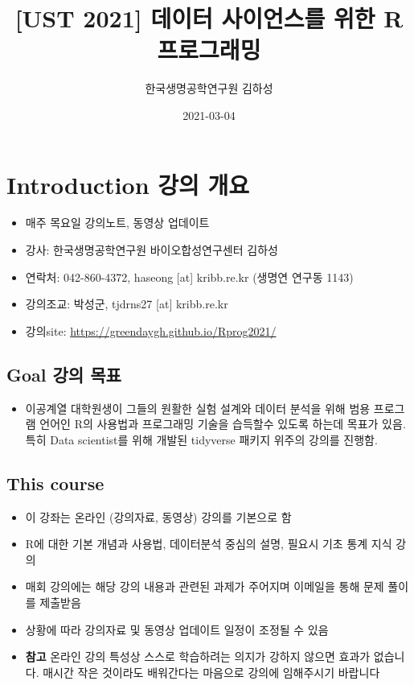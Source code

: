 \documentclass[
]{book}
\title{{[}UST 2021{]} 데이터 사이언스를 위한 R 프로그래밍}
\author{한국생명공학연구원 김하성}
\date{2021-03-04}
\providecommand{\tightlist}{%
  \setlength{\itemsep}{0pt}\setlength{\parskip}{0pt}}
\begin{document}
\maketitle

{
\setcounter{tocdepth}{1}
\tableofcontents
}
\hypertarget{introduction-uxac15uxc758-uxac1cuxc694}{%
\chapter{Introduction 강의 개요}\label{introduction-uxac15uxc758-uxac1cuxc694}}

\begin{itemize}
\tightlist
\item
  매주 목요일 강의노트, 동영상 업데이트
\item
  강사: 한국생명공학연구원 바이오합성연구센터 김하성
\item
  연락처: 042-860-4372, haseong {[}at{]} kribb.re.kr (생명연 연구동 1143)
\item
  강의조교: 박성군, tjdrns27 {[}at{]} kribb.re.kr
\item
  강의site: \url{https://greendaygh.github.io/Rprog2021/}
\end{itemize}

\hypertarget{goal-uxac15uxc758-uxbaa9uxd45c}{%
\section{Goal 강의 목표}\label{goal-uxac15uxc758-uxbaa9uxd45c}}

\begin{itemize}
\tightlist
\item
  이공계열 대학원생이 그들의 원활한 실험 설계와 데이터 분석을 위해 범용 프로그램 언어인 R의 사용법과 프로그래밍 기술을 습득할수 있도록 하는데 목표가 있음. 특히 Data scientist를 위해 개발된 tidyverse 패키지 위주의 강의를 진행함.
\end{itemize}

\hypertarget{this-course}{%
\section{This course}\label{this-course}}

\begin{itemize}
\tightlist
\item
  이 강좌는 온라인 (강의자료, 동영상) 강의를 기본으로 함
\item
  R에 대한 기본 개념과 사용법, 데이터분석 중심의 설명, 필요시 기초 통계 지식 강의
\item
  매회 강의에는 해당 강의 내용과 관련된 과제가 주어지며 이메일을 통해 문제 풀이를 제출받음
\item
  상황에 따라 강의자료 및 동영상 업데이트 일정이 조정될 수 있음
\item
  \textbf{참고} 온라인 강의 특성상 스스로 학습하려는 의지가 강하지 않으면 효과가 없습니다. 매시간 작은 것이라도 배워간다는 마음으로 강의에 임해주시기 바랍니다
\end{itemize}
\end{document}

